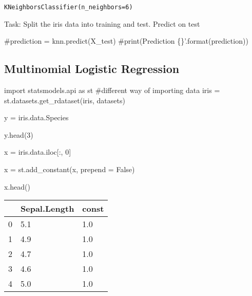 \documentclass[
  letterpaper,
  DIV=11,
  numbers=noendperiod]{scrreprt}
\newenvironment{Shaded}{\begin{snugshade}}{\end{snugshade}}
\newcommand{\CommentTok}[1]{\textcolor[rgb]{0.37,0.37,0.37}{#1}}
\newcommand{\DecValTok}[1]{\textcolor[rgb]{0.68,0.00,0.00}{#1}}
\newcommand{\ImportTok}[1]{\textcolor[rgb]{0.00,0.46,0.62}{#1}}
\newcommand{\NormalTok}[1]{\textcolor[rgb]{0.00,0.23,0.31}{#1}}
\newcommand{\OperatorTok}[1]{\textcolor[rgb]{0.37,0.37,0.37}{#1}}
\newcommand{\StringTok}[1]{\textcolor[rgb]{0.13,0.47,0.30}{#1}}
\newcommand{\VariableTok}[1]{\textcolor[rgb]{0.07,0.07,0.07}{#1}}
\begin{document}
\begin{verbatim}
KNeighborsClassifier(n_neighbors=6)
\end{verbatim}

Task: Split the iris data into training and test. Predict on test

\begin{Shaded}
\begin{Highlighting}[]
\CommentTok{\#prediction = knn.predict(X\_test)}
\CommentTok{\#print(\textquotesingle{}Prediction \{\}’.format(prediction))}
\end{Highlighting}
\end{Shaded}

\hypertarget{multinomial-logistic-regression}{%
\subsection{Multinomial Logistic
Regression}\label{multinomial-logistic-regression}}

\begin{Shaded}
\begin{Highlighting}[]
\ImportTok{import}\NormalTok{ statsmodels.api }\ImportTok{as}\NormalTok{ st}
\CommentTok{\#different way of importing data}
\NormalTok{iris }\OperatorTok{=}\NormalTok{ st.datasets.get\_rdataset(}\StringTok{\textquotesingle{}iris\textquotesingle{}}\NormalTok{, }\StringTok{\textquotesingle{}datasets\textquotesingle{}}\NormalTok{)}
 
\NormalTok{y }\OperatorTok{=}\NormalTok{ iris.data.Species}
 
\NormalTok{y.head(}\DecValTok{3}\NormalTok{)}

\NormalTok{x }\OperatorTok{=}\NormalTok{ iris.data.iloc[:, }\DecValTok{0}\NormalTok{]}
 
\NormalTok{x }\OperatorTok{=}\NormalTok{ st.add\_constant(x, prepend }\OperatorTok{=} \VariableTok{False}\NormalTok{)}
 
\NormalTok{x.head()}
\end{Highlighting}
\end{Shaded}

\begin{longtable}[]{@{}lll@{}}
\toprule()
& Sepal.Length & const \\
\midrule()
\endhead
0 & 5.1 & 1.0 \\
1 & 4.9 & 1.0 \\
2 & 4.7 & 1.0 \\
3 & 4.6 & 1.0 \\
4 & 5.0 & 1.0 \\
\bottomrule()
\end{longtable}
\end{document}
